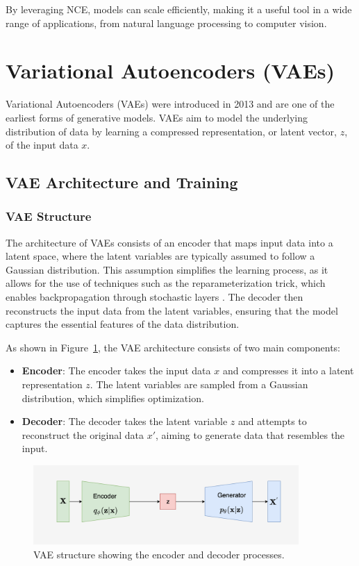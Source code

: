 By leveraging NCE, models can scale efficiently, making it a useful tool in a wide range of applications, from natural language processing to computer vision.


\section{Variational Autoencoders (VAEs)}

Variational Autoencoders (VAEs) were introduced in 2013 and are one of the earliest forms of generative models. VAEs aim to model the underlying distribution of data by learning a compressed representation, or latent vector, \(z\), of the input data \(x\).

\subsection{VAE Architecture and Training}

\subsubsection{VAE Structure}
The architecture of VAEs consists of an encoder that maps input data into a latent space, where the latent variables are typically assumed to follow a Gaussian distribution. This assumption simplifies the learning process, as it allows for the use of techniques such as the reparameterization trick, which enables backpropagation through stochastic layers \citep{10.1561/2200000056}. The decoder then reconstructs the input data from the latent variables, ensuring that the model captures the essential features of the data distribution.

As shown in Figure~\ref{fig:VAE_structure}, the VAE architecture consists of two main components:
\begin{itemize}
    \item \textbf{Encoder}: The encoder takes the input data \(x\) and compresses it into a latent representation \(z\). The latent variables are sampled from a Gaussian distribution, which simplifies optimization.
    \item \textbf{Decoder}: The decoder takes the latent variable \(z\) and attempts to reconstruct the original data \(x'\), aiming to generate data that resembles the input.
\end{itemize}

\begin{figure}[H]
    \centering
    \includegraphics[width=0.9\textwidth]{./Images/VAE_structure.jpg}
    \caption{VAE structure showing the encoder and decoder processes.}
    \label{fig:VAE_structure}
\end{figure}


